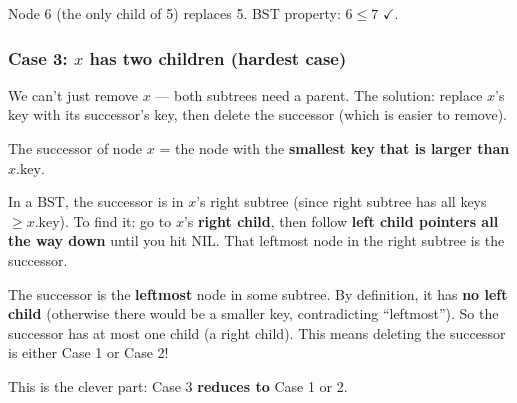 \documentclass[11pt]{article}
\begin{document}
\begin{center}
\end{center}

Node 6 (the only child of 5) replaces 5. BST property: $6 \leq 7$ $\checkmark$.

\subsubsection*{Case 3: $x$ has two children \textcolor{amber}{(hardest case)}}

We can't just remove $x$ — both subtrees need a parent. The solution: replace $x$'s key with its \textcolor{rustW}{successor}'s key, then delete the successor (which is easier to remove).

\begin{defbox}
The \textcolor{rustW}{successor} of node $x$ = the node with the \textbf{smallest key that is larger than} $x.\text{key}$.

In a BST, the successor is in $x$'s right subtree (since right subtree has all keys $\geq x.\text{key}$). To find it: go to $x$'s \textbf{right child}, then follow \textbf{left child pointers all the way down} until you hit NIL. That leftmost node in the right subtree is the successor.
\end{defbox}

\begin{keybox}
The successor is the \textbf{leftmost} node in some subtree. By definition, it has \textbf{no left child} (otherwise there would be a smaller key, contradicting ``leftmost''). So the successor has at most one child (a right child). This means deleting the successor is either Case 1 or Case 2!

This is the clever part: Case 3 \textbf{reduces to} Case 1 or 2.
\end{keybox}
\end{document}
